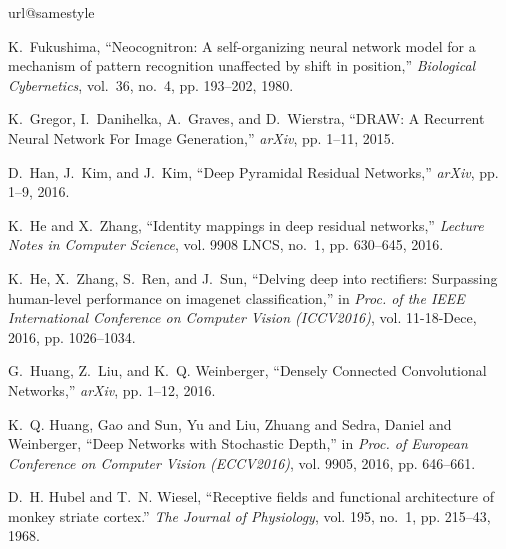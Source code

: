 \documentclass[journal]{IEEEtran}
\begin{document}
\begin{thebibliography}{10}
\providecommand{\url}[1]{#1}
\csname url@samestyle\endcsname
\providecommand{\newblock}{\relax}
\providecommand{\bibinfo}[2]{#2}
\providecommand{\BIBentrySTDinterwordspacing}{\spaceskip=0pt\relax}
\providecommand{\BIBentryALTinterwordstretchfactor}{4}
\providecommand{\BIBentryALTinterwordspacing}{\spaceskip=\fontdimen2\font plus
\BIBentryALTinterwordstretchfactor\fontdimen3\font minus
  \fontdimen4\font\relax}
\providecommand{\BIBforeignlanguage}[2]{{%
\expandafter\ifx\csname l@#1\endcsname\relax
\typeout{** WARNING: IEEEtranS.bst: No hyphenation pattern has been}%
\typeout{** loaded for the language `#1'. Using the pattern for}%
\typeout{** the default language instead.}%
\else
\language=\csname l@#1\endcsname
\fi
#2}}
\providecommand{\BIBdecl}{\relax}
\BIBdecl

K.~Fukushima, ``{Neocognitron: A self-organizing neural network model for a
  mechanism of pattern recognition unaffected by shift in position},''
  \emph{Biological Cybernetics}, vol.~36, no.~4, pp. 193--202, 1980.

K.~Gregor, I.~Danihelka, A.~Graves, and D.~Wierstra, ``{DRAW: A Recurrent
  Neural Network For Image Generation},'' \emph{arXiv}, pp. 1--11, 2015.

D.~Han, J.~Kim, and J.~Kim, ``{Deep Pyramidal Residual Networks},''
  \emph{arXiv}, pp. 1--9, 2016.

K.~He and X.~Zhang, ``{Identity mappings in deep residual networks},''
  \emph{Lecture Notes in Computer Science}, vol. 9908 LNCS, no.~1, pp.
  630--645, 2016.

K.~He, X.~Zhang, S.~Ren, and J.~Sun, ``{Delving deep into rectifiers:
  Surpassing human-level performance on imagenet classification},'' in
  \emph{Proc. of the IEEE International Conference on Computer Vision
  (ICCV2016)}, vol. 11-18-Dece, 2016, pp. 1026--1034.

G.~Huang, Z.~Liu, and K.~Q. Weinberger, ``{Densely Connected Convolutional
  Networks},'' \emph{arXiv}, pp. 1--12, 2016.

K.~Q. {Huang, Gao and Sun, Yu and Liu, Zhuang and Sedra, Daniel and
  Weinberger}, ``{Deep Networks with Stochastic Depth},'' in \emph{Proc. of
  European Conference on Computer Vision (ECCV2016)}, vol. 9905, 2016, pp.
  646--661.

D.~H. Hubel and T.~N. Wiesel, ``{Receptive fields and functional architecture
  of monkey striate cortex.}'' \emph{The Journal of Physiology}, vol. 195,
  no.~1, pp. 215--43, 1968.


\end{thebibliography}
\end{document}
